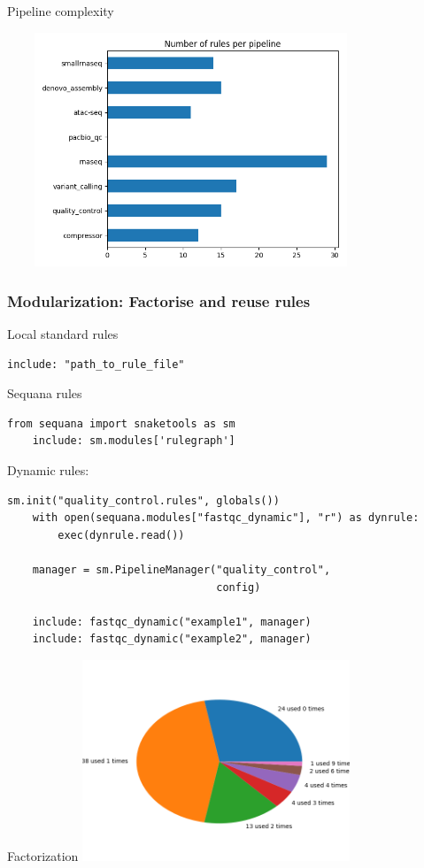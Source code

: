 \documentclass{beamer}
\begin{document}
\begin{frame}{Pipeline complexity}

    \includegraphics[width=11cm, height=7cm]{images/number_of_rules.png}

\end{frame}


\begin{frame}[fragile]
 \frametitle{Modularization: Factorise and reuse rules}

 
 Local standard rules
\begin{lstlisting}[basicstyle=\ttfamily\small] 
    include: "path_to_rule_file"
\end{lstlisting}

Sequana rules
\begin{lstlisting}[basicstyle=\ttfamily\small]
    from sequana import snaketools as sm
    include: sm.modules['rulegraph']
\end{lstlisting}

Dynamic rules:
\begin{lstlisting}[basicstyle=\ttfamily\small]
    sm.init("quality_control.rules", globals())
    with open(sequana.modules["fastqc_dynamic"], "r") as dynrule:
        exec(dynrule.read())
        
    manager = sm.PipelineManager("quality_control", 
                                 config)

    include: fastqc_dynamic("example1", manager)
    include: fastqc_dynamic("example2", manager)
\end{lstlisting}
\end{frame}


\begin{frame}{Factorization}
\centering
    \includegraphics[width=8cm]{images/rules_reusing.png}
\end{frame}
\end{document}
